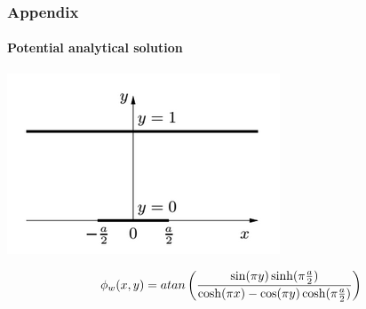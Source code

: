 \documentclass[14pt]{beamer}
\begin{document}
\begin{frame}
  \frametitle{Appendix}
  \framesubtitle{Potential analytical solution}

\begin{center}
  \includegraphics[scale=0.5]{images/analytic.png}
\end{center}

\vspace{-1.5em}

  \[\phi_w(x,y) = atan\left({\sin(\pi y)\sinh(\pi {a\over{2}})\over
      {\cosh(\pi x)-\cos(\pi y)\cosh(\pi {a\over{2}})}}\right)\]

\end{frame}
\end{document}
